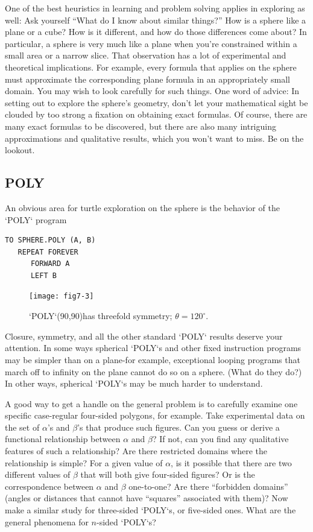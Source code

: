 \documentclass{book}
\begin{document}
One of the best heuristics in learning and problem solving applies in
exploring as well: Ask yourself ``What do I know about similar things?''
How is a sphere like a plane or a cube? How is it different, and how do
those differences come about? In particular, a sphere is very much like
a plane when you're constrained within a small area or a narrow slice.
That observation has a lot of experimental and theoretical implications.
For example, every formula that applies on the sphere must approximate
the corresponding plane formula in an appropriately small domain. You
may wish to look carefully for such things.
One word of advice: In setting out to explore the sphere's geometry,
don't let your mathematical sight be clouded by too strong a fixation
on obtaining exact formulas. Of course, there are many exact formulas
to be discovered, but there are also many intriguing approximations and
qualitative results, which you won't want to miss. Be on the lookout.

\subsection{POLY}

An obvious area for turtle exploration on the sphere is the behavior of
the \textsc{`POLY`} program

\begin{verbatim}
TO SPHERE.POLY (A, B)
   REPEAT FOREVER
      FORWARD A
      LEFT B
\end{verbatim}
\begin{figure}
\begin{center}
\texttt{[image: fig7-3]}
\caption{\textsc{`POLY`}(90,90)has threefold symmetry; $\theta = 120^{\circ}$.}
\end{center}
\end{figure}

Closure, symmetry, and all the other standard \textsc{`POLY`} results deserve your
attention. In some ways spherical \textsc{`POLY`}s and other fixed instruction
programs may be simpler than on a plane-for example, exceptional
looping programs that march off to infinity on the plane cannot do so
on a sphere. (What do they do?) In other ways, spherical \textsc{`POLY`}s may be
much harder to understand.

A good way to get a handle on the general problem is to carefully
examine one specific case-regular four-sided polygons, for example.
Take experimental data on the set of $\alpha$'s and $\beta$'s that produce such
figures. Can you guess or derive a functional relationship between $\alpha$ and
$\beta$? If not, can you find any qualitative features of such a relationship?
Are there restricted domains where the relationship is simple? For a
given value of $\alpha$, is it possible that there are two different values of $\beta$
that will both give four-sided figures? Or is the correspondence between
$\alpha$ and $\beta$ one-to-one? Are there ``forbidden domains'' (angles or distances
that cannot have ``squares'' associated with them)? Now make a similar
study for three-sided \textsc{`POLY`}s, or five-sided ones. What are the general
phenomena for $n$-sided \textsc{`POLY`}s?
\end{document}
